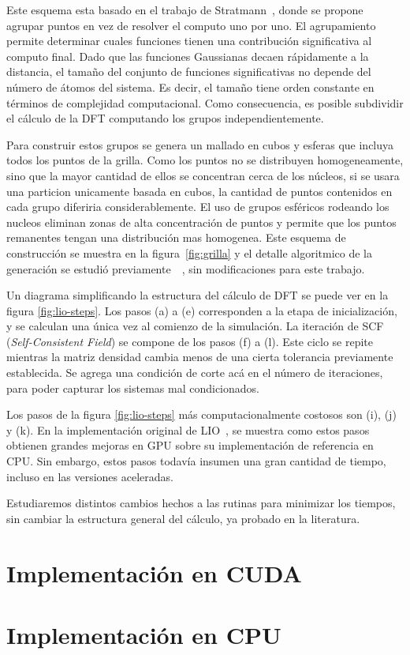 Este esquema esta basado en el trabajo de Stratmann~\cite{Stratmann}, donde se propone
agrupar puntos en vez de resolver el computo uno por uno. El agrupamiento permite determinar
cuales funciones tienen una contribuci\'on significativa al computo final. Dado que las
funciones Gaussianas decaen r\'apidamente a la distancia, el tama\~no del conjunto de
funciones significativas no depende del n\'umero de \'atomos del sistema. Es decir, el tama\~no
tiene orden constante en t\'erminos de complejidad computacional. Como consecuencia, es posible
subdividir el c\'alculo de la DFT computando los grupos independientemente.

Para construir estos grupos se genera un mallado en cubos y esferas que incluya todos los puntos
de la grilla. Como los puntos no se distribuyen homogeneamente, sino que la mayor cantidad de ellos
se concentran cerca de los n\'ucleos, si se usara una particion unicamente basada en cubos, la cantidad
de puntos contenidos en cada grupo diferiria considerablemente. El uso de grupos esf\'ericos rodeando
los nucleos eliminan zonas de alta concentraci\'on de puntos y permite que los puntos remanentes
tengan una distribuci\'on mas homogenea. Este esquema de construcci\'on se muestra en la figura~\ref{fig:grilla}
y el detalle algoritmico de la generaci\'on se estudi\'o previamente~\cite{LIO}~\cite{TesisNitsche},
sin modificaciones para este trabajo.

Un diagrama simplificando la estructura del c\'alculo de DFT se puede ver en la figura \ref{fig:lio-steps}.
Los pasos (a) a (e) corresponden a la etapa de inicializaci\'on, y se calculan una \'unica vez
al comienzo de la simulaci\'on. La iteraci\'on de SCF (\textit{Self-Consistent Field}) se
compone de los pasos (f) a (l). Este ciclo se repite mientras la matriz densidad cambia
menos de una cierta tolerancia previamente establecida. Se agrega una condici\'on de corte ac\'a
en el n\'umero de iteraciones, para poder capturar los sistemas mal condicionados.~\cite{LIO}

Los pasos de la figura \ref{fig:lio-steps} m\'as computacionalmente costosos son (i), (j) y (k).
En la implementaci\'on original de LIO~\cite{TesisNitsche}, se muestra como estos pasos
obtienen grandes mejoras en GPU sobre su implementaci\'on de referencia en CPU. Sin embargo,
estos pasos todav\'ia insumen una gran cantidad de tiempo, incluso en las versiones aceleradas.

Estudiaremos distintos cambios hechos a las rutinas para minimizar los tiempos,
sin cambiar la estructura general del c\'alculo, ya probado en la literatura.

\section{Implementaci\'on en CUDA}



\section{Implementaci\'on en CPU}


